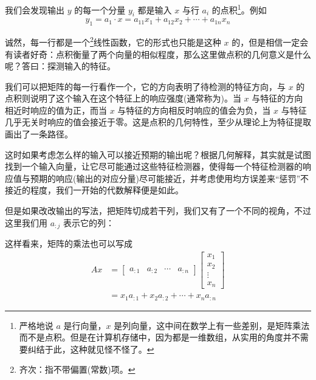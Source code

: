 我们会发现输出 $y$ 的每一个分量 $y_i$ 都是输入 $x$ 与行 $a_i$ 的点积\footnote{严格地说 $a$ 是行向量，$x$ 是列向量，这中间在数学上有一些差别，是矩阵乘法而不是点积。但是在计算机存储中，因为都是一维数组，从实用的角度并不需要纠结于此，这种就见怪不怪了。}。例如
\[
    y_1 = a_1 \cdot x = a_{11}x_1 + a_{12}x_2 + \cdots + a_{1n}x_n
\]

诚然，每一行都是一个\footnote{齐次：指不带偏置(常数)项。}线性函数，它的形式也只能是这种 $x$ 的，但是相信一定会有读者好奇：点积衡量了两个向量的相似程度，那么这里做点积的几何意义是什么呢？答曰：探测输入的特征。

我们可以把矩阵的每一行看作一个，它的方向表明了待检测的特征方向，与 $x$ 的点积则说明了这个输入在这个特征上的响应强度(通常称为)。当 $x$ 与特征的方向相近时响应的值为正，而当 $x$ 与特征的方向相反时响应的值会为负，当 $x$ 与特征几乎无关时响应的值会接近于零。这是点积的几何特性，至少从理论上为特征提取画出了一条路径。

这时如果考虑怎么样的输入可以接近预期的输出呢？根据几何解释，其实就是试图找到一个输入向量，让它尽可能通过这些特征检测器，使得每一个特征检测器的响应值与预期的响应(输出的对应分量)尽可能接近，并考虑使用均方误差来“惩罚”不接近的程度，我们一开始的代数解释便是如此。

但是如果改改输出的写法，把矩阵切成若干列，我们又有了一个不同的视角，不过这里我们用 $a_{:j}$ 表示它的列：
\begin{figure}[H]
    \centering
\end{figure}

这样看来，矩阵的乘法也可以写成
\[
\begin{aligned}
    Ax & = \begin{bmatrix}
        a_{:1} & a_{:2} & \cdots & a_{:n}
    \end{bmatrix}
    \begin{bmatrix}
        x_1 \\ x_2 \\ \vdots \\ x_n
    \end{bmatrix}
    \\
    &= x_1 a_{:1} + x_2 a_{:2} + \cdots + x_n a_{:n}
\end{aligned}
\]

